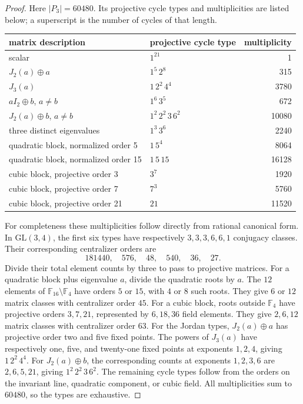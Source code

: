 \documentclass[11pt]{article}
\begin{document}
\begin{proof}
Here $|P_3|=60480$. Its projective cycle types and multiplicities are
listed below; a superscript is the number of cycles of that length.
\begin{center}
\small
\begin{tabular}{l|l|r}
matrix description & projective cycle type & multiplicity\\ \hline
scalar & $1^{21}$ & 1\\
$J_2(a)\oplus a$ & $1^5\,2^8$ & 315\\
$J_3(a)$ & $1\,2^2\,4^4$ & 3780\\
$aI_2\oplus b$, $a\ne b$ & $1^6\,3^5$ & 672\\
$J_2(a)\oplus b$, $a\ne b$ & $1^2\,2^2\,3\,6^2$ & 10080\\
three distinct eigenvalues & $1^3\,3^6$ & 2240\\
quadratic block, normalized order 5 & $1\,5^4$ & 8064\\
quadratic block, normalized order 15 & $1\,5\,15$ & 16128\\
cubic block, projective order 3 & $3^7$ & 1920\\
cubic block, projective order 7 & $7^3$ & 5760\\
cubic block, projective order 21 & $21$ & 11520
\end{tabular}
\end{center}
For completeness these multiplicities follow directly from rational
canonical form. In $\mathrm{GL}(3,4)$, the first six types have respectively
$3,3,3,6,6,1$ conjugacy classes. Their corresponding centralizer orders are
\[
181440,\quad576,\quad48,\quad540,\quad36,\quad27.
\]
Divide their total element counts by three
to pass to projective matrices.
For a quadratic block plus eigenvalue $a$, divide the quadratic roots
by $a$. The $12$ elements of $\mathbb F_{16}\setminus\mathbb F_4$
have orders $5$ or $15$, with $4$ or $8$ such roots.
They give $6$ or $12$ matrix classes with centralizer order $45$.
For a cubic block, roots outside $\mathbb F_4$ have projective orders
$3,7,21$, represented by $6,18,36$ field elements.
They give $2,6,12$ matrix classes with centralizer order $63$.
For the Jordan types, $J_2(a)\oplus a$ has projective order two and five
fixed points. The powers of $J_3(a)$ have respectively one, five, and
twenty-one fixed points at exponents $1,2,4$, giving $1\,2^2\,4^4$.
For $J_2(a)\oplus b$, the corresponding counts at exponents $1,2,3,6$
are $2,6,5,21$, giving $1^2\,2^2\,3\,6^2$.
The remaining cycle types follow from the orders on the invariant line,
quadratic component, or cubic field. All multiplicities sum to $60480$,
so the types are exhaustive.


\end{proof}
\end{document}
